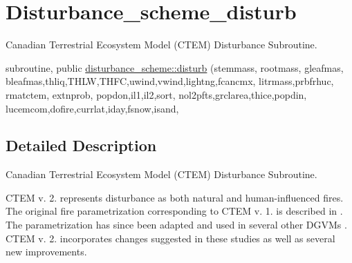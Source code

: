 \hypertarget{group__disturbance__scheme__disturb}{}\section{Disturbance\+\_\+scheme\+\_\+disturb}
\label{group__disturbance__scheme__disturb}


Canadian Terrestrial Ecosystem Model (C\+T\+E\+M) Disturbance Subroutine.  


\begin{DoxyCompactItemize}
\item 
subroutine, public \hyperlink{group__disturbance__scheme__disturb_ga43f1709a7ea90ed6c9c37f54c2f5478b}{disturbance\+\_\+scheme\+::disturb} (stemmass, rootmass, gleafmas, bleafmas,thliq,T\+H\+L\+W,T\+H\+F\+C,uwind,vwind,lightng,fcancmx, litrmass,prbfrhuc, rmatctem, extnprob, popdon,il1,il2,sort, nol2pfts,grclarea,thice,popdin, lucemcom,dofire,currlat,iday,fsnow,isand,
\end{DoxyCompactItemize}


\subsection{Detailed Description}
Canadian Terrestrial Ecosystem Model (C\+T\+E\+M) Disturbance Subroutine. 

C\+T\+E\+M v. 2. represents disturbance as both natural and human-\/influenced fires. The original fire parametrization corresponding to C\+T\+E\+M v. 1. is described in \cite{Arora20052ac}. The parametrization has since been adapted and used in several other D\+G\+V\+Ms \cite{Kloster2010-633} \cite{Kloster2012-c79} \cite{Migliavacca2013-eh} \cite{Li20121c2}. C\+T\+E\+M v. 2. incorporates changes suggested in these studies as well as several new improvements.

